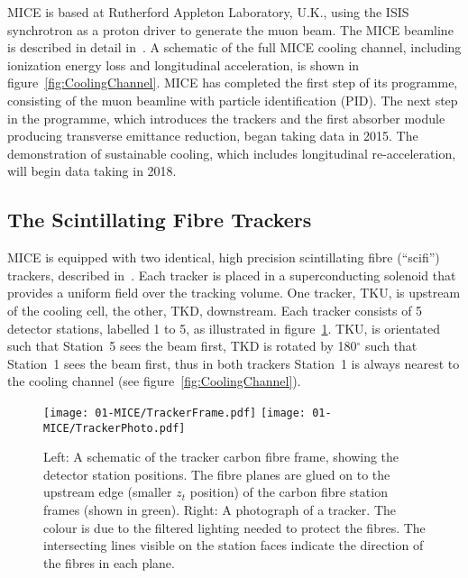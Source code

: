   MICE is based at Rutherford Appleton Laboratory, U.K., using the ISIS synchrotron as a proton driver\cite{MiceTarget} to generate the muon beam.  The MICE beamline is described in detail in~\cite{MiceBeamline}. A schematic of the full MICE cooling channel, including ionization energy loss and longitudinal acceleration, is shown in figure~\ref{fig:CoolingChannel}.  MICE has completed the first step of its programme, consisting of the muon beamline with particle identification (PID). The next step in the programme, which introduces the trackers and the first absorber module producing transverse emittance reduction, began taking data in 2015. The demonstration of sustainable cooling, which includes longitudinal re-acceleration, will begin data taking in 2018.


  \subsection{The Scintillating Fibre Trackers}
  \label{subsec:Trackers}
  MICE is equipped with two identical, high precision scintillating fibre (``scifi'') trackers, described in~\cite{MiceTrackers}. Each tracker is placed in a superconducting solenoid that provides a uniform field over the tracking volume. One tracker, TKU, is upstream of the cooling cell, the other, TKD, downstream.  Each tracker consists of 5 detector stations, labelled 1 to 5, as illustrated in figure~\ref{fig:Trackers}. TKU, is orientated such that Station~5 sees the beam first, TKD is rotated by 180$^\circ$ such that Station~1 sees the beam first, thus in both trackers Station~1 is always nearest to the cooling channel (see figure~\ref{fig:CoolingChannel}).
  
  \begin{figure}[tbh]
    \centering
    \texttt{[image: 01-MICE/TrackerFrame.pdf]} \hspace{2pc}%
    \texttt{[image: 01-MICE/TrackerPhoto.pdf]}
    \caption{\label{fig:Trackers} Left: A schematic of the tracker carbon fibre frame, showing the detector station positions.  The fibre planes are glued on to the upstream edge (smaller $z_t$ position) of the carbon fibre station frames (shown in green). Right: A photograph of a tracker. The colour is due to the filtered lighting needed to protect the fibres. The intersecting lines visible on the station faces indicate the direction of the fibres in each plane.}
  \end{figure}

